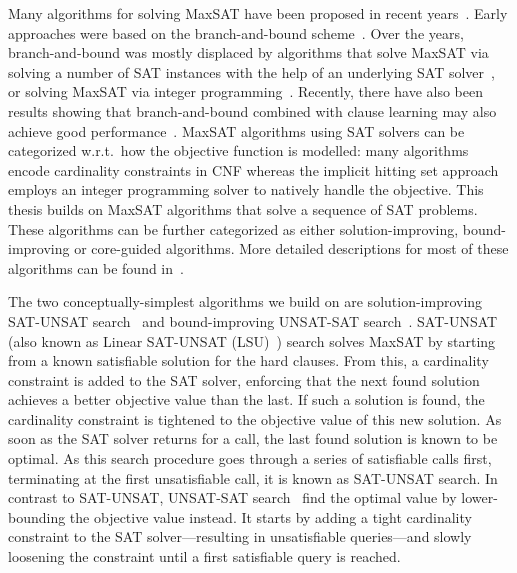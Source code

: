 Many algorithms for solving MaxSAT have been proposed in recent years~\autocites{DBLP:conf/sat/FuM06,DBLP:journals/jsat/BerreP10,DBLP:conf/cp/MorgadoDM14,DBLP:journals/jsat/IgnatievMM19,DBLP:conf/cp/DaviesB11,DBLP:conf/cp/LiXCMHH21}.
Early approaches were based on the branch-and-bound scheme~\autocites{handbook2-maxsat-old,DBLP:conf/sat/AlsinetMP05,DBLP:conf/cp/Planes03,DBLP:journals/jgo/AlsinetMP08,DBLP:journals/jair/HerasLO08}.
Over the years, branch-and-bound was mostly displaced by algorithms that solve MaxSAT via solving a number of SAT instances with the help of an underlying SAT solver~\autocite{handbook2-cdcl}, or solving MaxSAT via integer programming~\autocite{handbook2-maxsat}.
Recently, there have also been results showing that branch-and-bound combined with clause learning may also achieve good performance~\autocites{DBLP:conf/cp/LiXCMHH21,LiEtAl2021Boostingbranchbound}.
MaxSAT algorithms using SAT solvers can be categorized w.r.t.\ how the objective function is modelled:
many algorithms encode cardinality constraints in CNF whereas the implicit hitting set approach~\autocites{DBLP:conf/cp/DaviesB13,DBLP:conf/sat/DaviesB13,DBLP:conf/cp/DaviesB11,DBLP:conf/sat/BergBP20} employs an integer programming solver to natively handle the objective.
This thesis builds on MaxSAT algorithms that solve a sequence of SAT problems.
These algorithms can be further categorized as either solution-improving, bound-improving or core-guided algorithms.
More detailed descriptions for most of these algorithms can be found in~\autocite{handbook2-maxsat}.

The two conceptually-simplest algorithms we build on are solution-improving SAT-UNSAT search~\autocite{DBLP:journals/jsat/BerreP10} and bound-improving UNSAT-SAT search~\autocite{DBLP:conf/sat/FuM06}.
SAT-UNSAT (also known as Linear SAT-UNSAT (LSU)~\autocite{handbook2-maxsat}) search solves MaxSAT by starting from a known satisfiable solution for the hard clauses.
From this, a cardinality constraint is added to the SAT solver, enforcing that the next found solution achieves a better objective value than the last.
If such a solution is found, the cardinality constraint is tightened to the objective value of this new solution.
As soon as the SAT solver returns \unsat{} for a call, the last found solution is known to be optimal.
As this search procedure goes through a series of satisfiable calls first, terminating at the first unsatisfiable call, it is known as SAT-UNSAT search.
In contrast to SAT-UNSAT, UNSAT-SAT search~\autocites{DBLP:conf/sat/FuM06,DBLP:journals/tcad/XuRS03} find the optimal value by lower-bounding the objective value instead.
It starts by adding a tight cardinality constraint to the SAT solver---resulting in unsatisfiable queries---and slowly loosening the constraint until a first satisfiable query is reached.

